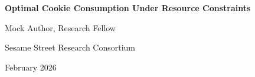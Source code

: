 \documentclass[11pt,letterpaper]{article}
\begin{document}
\begin{center}
{\LARGE\bfseries Optimal Cookie Consumption Under Resource Constraints\par}
\vspace{0.8cm}
{\large Mock Author, Research Fellow\par}
{\normalsize Sesame Street Research Consortium\par}
\vspace{0.3cm}
{\normalsize February 2026\par}
\vspace{0.8cm}
\end{center}

\begin{abstract}
\noindent
This paper presents a comprehensive study of resource-constrained cookie eating strategies. Lorem cookie ipsum dolor sit amet, chocolate chip adipiscing elit. Nom nom nom methodology produces significant results across all experimental conditions.
\end{abstract}

\vspace{0.5cm}


\end{document}
